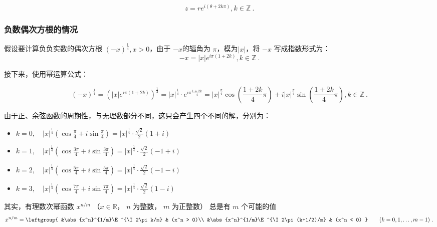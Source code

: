 \begin{equation}
z = r e^{i(\theta+2k\pi)},k\in\mathbb{Z}~.
\end{equation}

\subsubsection{负数偶次方根的情况}

假设要计算负负实数的偶次方根 $(-x)^{\frac{1}{4}},x>0$，由于 $-x$的辐角为 $\pi$，模为$|x|$，将 $-x$ 写成指数形式为：
\begin{equation}
-x = |x| e^{i\pi(1+2k)},k\in\mathbb{Z}~.
\end{equation}

接下来，使用幂运算公式：

\begin{equation}
\displaystyle
(-x)^{\frac{1}{4}} = \left( |x| e^{i\pi(1+2k)} \right)^{\frac{1}{4}} =|x|^{\frac{1}{4}} \cdot e^{i\pi\frac{1+2k}{4}}=|x|^{\frac{\pi}{4}}\cos(\frac{1+2k}{4}\pi) + i|x|^{\frac{\pi}{4}}\sin(\frac{1+2k}{4}\pi),k\in\mathbb{Z}~.
\end{equation}

由于正、余弦函数的周期性，与无理数部分不同，这只会产生四个不同的解，分别为：

\begin{itemize}
\item $\displaystyle k = 0,\quad |x|^{\frac{1}{4}} \left( \cos\frac{\pi}{4} + i\sin\frac{\pi}{4} \right) = |x|^{\frac{1}{4}} \cdot \frac{\sqrt{2}}{2} \left( 1 + i \right)$
\item $\displaystyle k = 1,\quad |x|^{\frac{1}{4}} \left( \cos\frac{3\pi}{4} + i\sin\frac{3\pi}{4} \right) = |x|^{\frac{1}{4}} \cdot \frac{\sqrt{2}}{2} \left( -1 +i \right)$
\item $\displaystyle k = 2,\quad |x|^{\frac{1}{4}} \left( \cos\frac{5\pi}{4} + i\sin\frac{5\pi}{4} \right) = |x|^{\frac{1}{4}} \cdot \frac{\sqrt{2}}{2} \left( -1 - i \right)$
\item $\displaystyle k = 3,\quad |x|^{\frac{1}{4}} \left( \cos\frac{7\pi}{4} + i\sin\frac{7\pi}{4} \right) = |x|^{\frac{1}{4}} \cdot \frac{\sqrt{2}}{2} \left( 1 - i \right)$
\end{itemize}

其实，有理数次幂函数 $x^{n/m}$ （$x\in \mathbb R$， $n$ 为整数， $m$ 为正整数） 总是有 $m$ 个可能的值
\begin{equation}
x^{n/m} = \leftgroup{
&\abs{x^n}^{1/m}\E^{\I 2\pi k/m} & (x^n > 0)\\
&\abs{x^n}^{1/m}\E^{\I 2\pi (k+1/2)/m} & (x^n < 0)
}\qquad (k = 0,1,\dots, m-1)~.
\end{equation}


